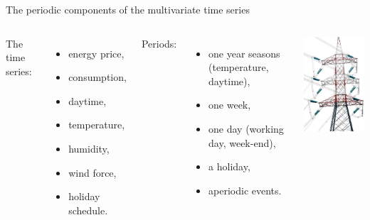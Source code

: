 \documentclass{beamer}
\begin{document}
\begin{frame}[t]{The periodic components of the multivariate time series}

\vfill
\begin{columns}[c]
\column{1.5in}
   The time series:

   \bigskip
   \begin{itemize}
       \item energy price,
       \item consumption,
       \item daytime,
       \item temperature,
       \item humidity,
       \item wind force,
       \item holiday schedule.
   \end{itemize}
\column{1.5in}
   Periods:

   \bigskip
   \begin{itemize}
       \item one year seasons (temperature, daytime),
       \item one week,
       \item one day (working day, week-end),
       \item a holiday,
       \item aperiodic events.
   \end{itemize}

\column{1.5in}
   \includegraphics[width=2in]{fig/fig0.png}
\end{columns}
\vfill
\end{frame}
\end{document}
